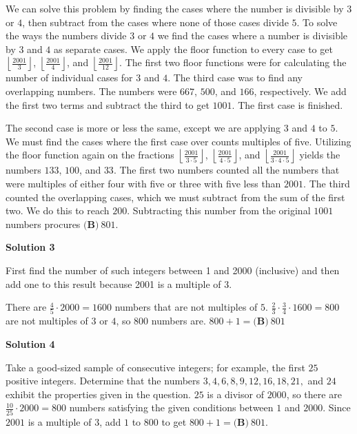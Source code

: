 \begin{enumerate}
We can solve this problem by finding the cases where the number is divisible by $3$ or $4$, then subtract from the cases where none of those cases divide $5$. To solve the ways the numbers divide $3$ or $4$ we find the cases where a number is divisible by $3$ and $4$ as separate cases. We apply the floor function to every case to get $\left\lfloor \frac{2001}{3} \right\rfloor$, $\left\lfloor \frac{2001}{4} \right\rfloor$, and $\left\lfloor \frac{2001}{12} \right\rfloor$. The first two floor functions were for calculating the number of individual cases for $3$ and $4$. The third case was to find any overlapping numbers. The numbers were $667$, $500$, and $166$, respectively. We add the first two terms and subtract the third to get $1001$. The first case is finished.

 The second case is more or less the same, except we are applying $3$ and $4$ to $5$. We must find the cases where the first case over counts multiples of five. Utilizing the floor function again on the fractions $\left\lfloor \frac{2001}{3\cdot5} \right\rfloor$, $\left\lfloor \frac{2001}{4\cdot5} \right\rfloor$, and $\left\lfloor \frac{2001}{3\cdot4\cdot5} \right\rfloor$ yields the numbers $133$, $100$, and $33$. The first two numbers counted all the numbers that were multiples of either four with five or three with five less than $2001$. The third counted the overlapping cases, which we must subtract from the sum of the first two. We do this to reach $200$. Subtracting this number from the original $1001$ numbers procures $\boxed{\textbf{(B)}\ 801}$.

 



\textbf{Solution 3}

First find the number of such integers between 1 and 2000 (inclusive) and then add one to this result because 2001 is a multiple of $3$.

 There are $\frac45\cdot2000=1600$ numbers that are not multiples of $5$.  $\frac23\cdot\frac34\cdot1600=800$ are not multiples of $3$ or $4$, so $800$ numbers are.  $800+1=\boxed{\textbf{(B)}\ 801}$




\textbf{Solution 4}

Take a good-sized sample of consecutive integers; for example, the first $25$ positive integers. Determine that the numbers $3, 4, 6, 8, 9, 12, 16, 18, 21,$ and $24$ exhibit the properties given in the question. $25$ is a divisor of $2000$, so there are $\frac{10}{25}\cdot2000=800$ numbers satisfying the given conditions between $1$ and $2000$. Since $2001$ is a multiple of $3$, add $1$ to $800$ to get $800+1=\boxed{\textbf{(B)}\ 801}$.


\end{enumerate}
